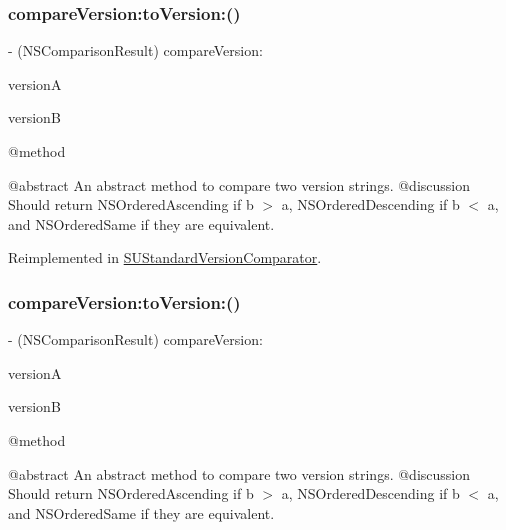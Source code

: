 \subsubsection{\texorpdfstring{compareVersion:toVersion:()}{compareVersion:toVersion:()}\hspace{0.1cm}{\footnotesize\ttfamily [1/4]}}
{\footnotesize\ttfamily -\/ (N\+S\+Comparison\+Result) compare\+Version\+: \begin{DoxyParamCaption}\item[{(N\+S\+String $\ast$)}]{versionA }\item[{to\+Version\+:(N\+S\+String $\ast$)}]{versionB }\end{DoxyParamCaption}}

@method

@abstract An abstract method to compare two version strings. @discussion Should return N\+S\+Ordered\+Ascending if b $>$ a, N\+S\+Ordered\+Descending if b $<$ a, and N\+S\+Ordered\+Same if they are equivalent. 

Reimplemented in \mbox{\hyperlink{interface_s_u_standard_version_comparator_a32eac2a727abd9d3c6890f7ac7ca50f1}{S\+U\+Standard\+Version\+Comparator}}.

\mbox{\label{protocol_s_u_version_comparison-p_a7ee54ef49cade9b0a856bdc8c7fff2f4}} 
\subsubsection{\texorpdfstring{compareVersion:toVersion:()}{compareVersion:toVersion:()}\hspace{0.1cm}{\footnotesize\ttfamily [2/4]}}
{\footnotesize\ttfamily -\/ (N\+S\+Comparison\+Result) compare\+Version\+: \begin{DoxyParamCaption}\item[{(N\+S\+String $\ast$)}]{versionA }\item[{to\+Version\+:(N\+S\+String $\ast$)}]{versionB }\end{DoxyParamCaption}}

@method

@abstract An abstract method to compare two version strings. @discussion Should return N\+S\+Ordered\+Ascending if b $>$ a, N\+S\+Ordered\+Descending if b $<$ a, and N\+S\+Ordered\+Same if they are equivalent. 

